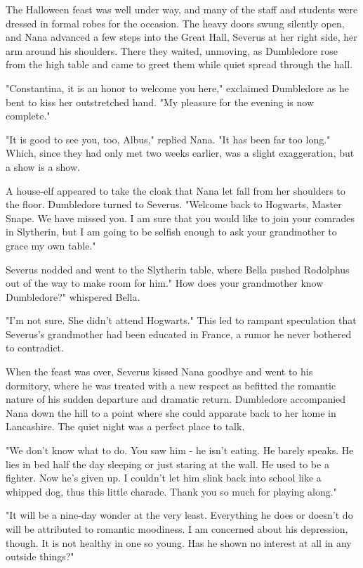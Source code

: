 \documentclass[a4paper,11pt]{article}
\begin{document}
The Halloween feast was well under way, and many of the staff and students were dressed in formal robes for the occasion. The heavy doors swung silently open, and Nana advanced a few steps into the Great Hall, Severus at her right side, her arm around his shoulders. There they waited, unmoving, as Dumbledore rose from the high table and came to greet them while quiet spread through the hall.

"Constantina, it is an honor to welcome you here," exclaimed Dumbledore as he bent to kiss her outstretched hand. "My pleasure for the evening is now complete."

"It is good to see you, too, Albus," replied Nana. "It has been far too long." Which, since they had only met two weeks earlier, was a slight exaggeration, but a show is a show.

A house-elf appeared to take the cloak that Nana let fall from her shoulders to the floor. Dumbledore turned to Severus. "Welcome back to Hogwarts, Master Snape. We have missed you. I am sure that you would like to join your comrades in Slytherin, but I am going to be selfish enough to ask your grandmother to grace my own table."

Severus nodded and went to the Slytherin table, where Bella pushed Rodolphus out of the way to make room for him." How does your grandmother know Dumbledore?" whispered Bella.

"I'm not sure. She didn't attend Hogwarts." This led to rampant speculation that Severus's grandmother had been educated in France, a rumor he never bothered to contradict.

When the feast was over, Severus kissed Nana goodbye and went to his dormitory, where he was treated with a new respect as befitted the romantic nature of his sudden departure and dramatic return. Dumbledore accompanied Nana down the hill to a point where she could apparate back to her home in Lancashire. The quiet night was a perfect place to talk.

"We don't know what to do. You saw him - he isn't eating. He barely speaks. He lies in bed half the day sleeping or just staring at the wall. He used to be a fighter. Now he's given up. I couldn't let him slink back into school like a whipped dog, thus this little charade. Thank you so much for playing along."

"It will be a nine-day wonder at the very least. Everything he does or doesn't do will be attributed to romantic moodiness. I am concerned about his depression, though. It is not healthy in one so young. Has he shown no interest at all in any outside things?"
\end{document}
